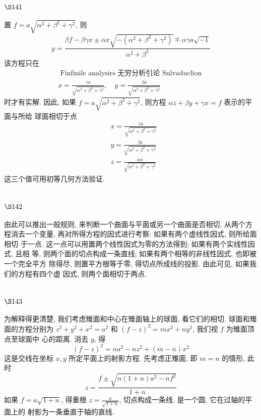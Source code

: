 \section{$\S 141$}

置 $f=a \sqrt{\alpha^{2}+\beta^{2}+\gamma^{2}}$, 则
\[
y=\frac{\beta f-\beta \gamma x \pm \alpha x \sqrt{-\left(\alpha^{2}+\beta^{2}+\gamma^{2}\right)} \mp \alpha \gamma a \sqrt{-1}}{\alpha^{2}+\beta^{2}}
\]
该方程只在 
\[
\begin{gathered}
\text { Finfinile analysirs 无穷分析引论 Snlvaduclion } \\
x=\frac{\gamma a}{\sqrt{\alpha^{2}+\beta^{2}+\gamma^{2}}}, \quad y=\frac{\beta a}{\sqrt{\alpha^{2}+\beta^{2}+\gamma^{2}}}
\end{gathered}
\]
时才有实解. 因此, 如果 $f=a \sqrt{\alpha^{2}+\beta^{2}+\gamma^{2}}$, 则方程 $\alpha z+\beta y+\gamma x=f$ 表示的平面与所给 球面相切于点
\[
\begin{aligned}
& x=\frac{\gamma a}{\sqrt{\alpha^{2}+\beta^{2}+\gamma^{2}}} \\
& y=\frac{\beta a}{\sqrt{\alpha^{2}+\beta^{2}+\gamma^{2}}} \\
& z=\frac{\alpha a}{\sqrt{\alpha^{2}+\beta^{2}+\gamma^{2}}}
\end{aligned}
\]
这三个值可用初等几何方法验证.

\section{$\S 142$}

由此可以推出一般规则, 来判断一个曲面与平面或另一个曲面是否相切. 从两个方 程消去一个变量, 再对所得方程的因式进行考察: 如果有两个虚线性因式, 则所给面相切 于一点. 这一点可以用置两个线性因式为零的方法得到; 如果有两个实线性因式, 且相 等, 则两个面的切点构成一条直线; 如果有两个相等的非线性因式, 也即被一个完全平方 除得尽, 则置平方根等于零, 得切点所成线的投影. 由此可见, 如果我们的方程有四个虚 因式, 则两个面相切于两点.

\section{$\S 143$}

为解释得更清楚, 我们考虑雉面和中心在雉面轴上的球面, 看它们的相切. 球面和雉 面的方程分别为 $z^{2}+y^{2}+x^{2}=a^{2}$ 和 $(f-z)^{2}=m x^{2}+n y^{2}$, 我们视 $f$ 为雉面顶点至球面中 心的距离. 消去 $y$, 得
\[
(f-z)^{2}=n a^{2}-n z^{2}+(m-n) x^{2}
\]
这是交线在坐标 $x, y$ 所定平面上的射影方程. 先考虑正雉面, 即 $m=n$ 的情形, 此时
\[
z=\frac{f \pm \sqrt{n(1+n) a^{2}-n f^{2}}}{1+n}
\]
如果 $f=a \sqrt{1+n}$, 得重根 $z=\frac{a}{\sqrt{1+n}}$, 切点构成一条线, 是一个圆, 它在过轴的平面上的 射影为一条垂直于轴的直线.

